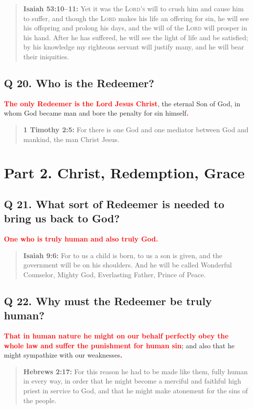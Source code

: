 \documentclass[titlepage]{memoir}
\newcommand\Children[1]{\textbf{\textcolor{red}{#1}}}
\newcommand\Quote[2]{\begin{quote}{\small\textbf{#1:}{ #2}}\end{quote}}
\begin{document}
\Quote{Isaiah 53:10--11}{Yet it was the \textsc{Lord's} will to crush him and cause him to suffer, and though the \textsc{Lord} makes his life an offering for sin, he will see his offspring and prolong his days, and the will of the \textsc{Lord} will prosper in his hand. After he has suffered, he will see the light of life and be satisfied; by his knowledge my righteous servant will justify many, and he will bear their iniquities.}

\subsection[Q 20. Who is the Redeemer?]{Q 20. Who is the Redeemer?}
\Children{The only Redeemer is the Lord Jesus Christ}, the eternal Son of God, in whom God became man and bore the penalty for sin himself\Children{.}

\Quote{1 Timothy 2:5}{For there is one God and one mediator between God and mankind, the man Christ Jesus.}


\section[Part 2. Christ, Redemption, Grace][Christ, Redemption, Grace]{Part 2. Christ, Redemption, Grace}

\subsection{Q 21. What sort of Redeemer is needed to bring us back to God?}
\Children{One who is truly human and also truly God.}

\Quote{Isaiah 9:6}{For to us a child is born, to us a son is given, and the government will be on his shoulders. And he will be called Wonderful Counselor, Mighty God, Everlasting Father, Prince of Peace.}

\subsection{Q 22. Why must the Redeemer be truly human?}
\Children{That in human nature he might on our behalf perfectly obey the whole law and suffer the punishment for human sin}; and also that he might sympathize with our weaknesses\Children{.}

\Quote{Hebrews 2:17}{For this reason he had to be made like them, fully human in every way, in order that he might become a merciful and faithful high priest in service to God, and that he might make atonement for the sins of the people.}
\end{document}
